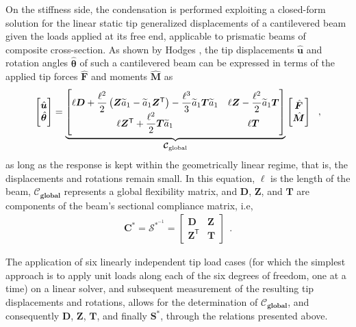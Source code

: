 \documentclass[journal]{new-aiaa}
\newcommand{\vect}[1]{\bm{#1}}
\def\tens#1{\bm{#1}}
\def\til#1{\widetilde{#1}}
\def\lp{\left(}
\def\rp{\right)}
\def\T{\mathsf{T}}
\def\aonetil{\til{a}_1}
\def\u{\vect{u}}
\def\Stiff{\mathcal{\tens{S}}^*}
\def\Flex{\mathcal{\tens{C}}^*}
\begin{document}
On the stiffness side, the condensation is performed exploiting a closed-form solution for the linear static tip generalized displacements of a cantilevered beam given the loads applied at its free end, applicable to prismatic beams of composite cross-section. As shown by Hodges \cite{hodges2006nonlinear}, the tip displacements $\hat{\u}$ and rotation angles $\hat{\vect{\theta}}$ of such a cantilevered beam can be expressed in terms of the applied tip forces $\hat{\vect{F}}$ and moments $\hat{\vect{M}}$ as
\begin{align}
    \begin{bmatrix}
        \hat{\u} \\
        \hat{\vect{\theta}}
    \end{bmatrix}
    =
    \underbrace{
    \begin{bmatrix}
        \ell\tens{D} + \dfrac{\ell^2}{2} \lp\tens{Z}\aonetil-\aonetil\tens{Z}^\T\rp - \dfrac{\ell^3}{3}\aonetil\tens{T}\aonetil & \ell\tens{Z} - \dfrac{\ell^2}{2}\aonetil\tens{T} \\
        \ell\tens{Z}^\T + \dfrac{\ell^2}{2}\tens{T}\aonetil & \ell\tens{T}
    \end{bmatrix}
    }_{\large\tens{\mathcal{C}_\text{global}}}
    \begin{bmatrix}
        \hat{\vect{F}} \\
        \hat{\vect{M}}
    \end{bmatrix} \ \ ,
\end{align}
as long as the response is kept within the geometrically linear regime, that is, the displacements and rotations remain small. In this equation, $\ell$ is the length of the beam, $\tens{\mathcal{C}_\text{global}}$ represents a global flexibility matrix, and $\tens{D}$, $\tens{Z}$, and $\tens{T}$ are components of the beam's sectional compliance matrix, i.e,
\begin{align}
    \Flex = \tens{\mathcal{S}}^{*^{-1}} = 
    \begin{bmatrix}
        \tens{D} & \tens{Z} \\
        \tens{Z}^\T & \tens{T}
    \end{bmatrix} \ \ .
\end{align}

The application of six linearly independent tip load cases (for which the simplest approach is to apply unit loads along each of the six degrees of freedom, one at a time) on a linear solver, and subsequent measurement of the resulting tip displacements and rotations, allows for the determination of $\tens{\mathcal{C}_\text{global}}$, and consequently $\tens{D}$, $\tens{Z}$, $\tens{T}$, and finally $\Stiff$, through the relations presented above. 
\end{document}
